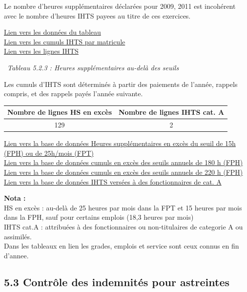 Le nombre d'heures supplémentaires déclarées pour 2009, 2011 est
incohérent avec le nombre d'heures IHTS payees au titre de ces
exercices.

\href{../Bases/Reglementation/CumHS.csv}{Lien vers les données du
tableau}\\
\href{../Bases/Reglementation/lignes.IHTS.tot.csv}{Lien vers les cumuls
IHTS par matricule}\\
\href{../Bases/Reglementation/lignes.IHTS.csv}{Lien vers les lignes IHTS}

~\emph{Tableau 5.2.3 : Heures supplémentaires au-delà des seuils}

Les cumuls d'IHTS sont déterminés à partir des paiements de l'année,
rappels compris, et des rappels payés l'année suivante.

\begin{longtable}[]{@{}cc@{}}
\toprule
Nombre de lignes HS en excès & Nombre de lignes IHTS cat.
A\tabularnewline
\midrule
\endhead
129 & 2\tabularnewline
\bottomrule
\end{longtable}

\href{../Bases/Reglementation/HS.sup.25.csv}{Lien vers la base de données
Heures supplémentaires en excès du seuil de 15h (FPH) ou de 25h/mois
(FPT)}\\
\href{../Bases/Reglementation/Depassement.seuil.180h.csv}{Lien vers la base
de données cumuls en excès des seuils annuels de 180 h (FPH)}\\
\href{../Bases/Reglementation/Depassement.seuil.220h.csv}{Lien vers la base
de données cumuls en excès des seuils annuels de 220 h (FPH)}\\
\href{../Bases/Reglementation/ihts.cat.A.csv}{Lien vers la base de données
IHTS versées à des fonctionnaires de cat. A}

\textbf{Nota :}\\
HS en excès : au-delà de 25 heures par mois dans la FPT et 15 heures par
mois dans la FPH, sauf pour certains emplois (18,3 heures par mois)\\
IHTS cat.A : attribuées à des fonctionnaires ou non-titulaires de
categorie A ou assimilés.\\
Dans les tableaux en lien les grades, emplois et service sont ceux
connus en fin d'annee.

\hypertarget{controle-des-indemnites-pour-astreintes}{%
\subsection{5.3 Contrôle des indemnités pour
astreintes}\label{controle-des-indemnites-pour-astreintes}}

